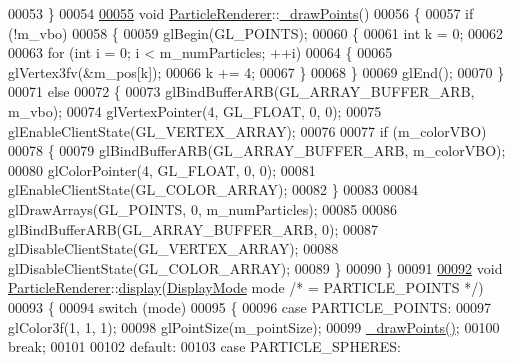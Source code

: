 \begin{DoxyCode}
00053 \}
00054 
\hypertarget{render__particles_8cpp_source_l00055}{}\hyperlink{class_particle_renderer_a2683c43c010bff7973a977c1953f2bd6}{00055} \textcolor{keywordtype}{void} \hyperlink{class_particle_renderer}{ParticleRenderer}::\hyperlink{class_particle_renderer_a2683c43c010bff7973a977c1953f2bd6}{\_drawPoints}()
00056 \{
00057     \textcolor{keywordflow}{if} (!m\_vbo)
00058     \{
00059         glBegin(GL\_POINTS);
00060         \{
00061             \textcolor{keywordtype}{int} k = 0;
00062 
00063             \textcolor{keywordflow}{for} (\textcolor{keywordtype}{int} i = 0; i < m\_numParticles; ++i)
00064             \{
00065                 glVertex3fv(&m\_pos[k]);
00066                 k += 4;
00067             \}
00068         \}
00069         glEnd();
00070     \}
00071     \textcolor{keywordflow}{else}
00072     \{
00073         glBindBufferARB(GL\_ARRAY\_BUFFER\_ARB, m\_vbo);
00074         glVertexPointer(4, GL\_FLOAT, 0, 0);
00075         glEnableClientState(GL\_VERTEX\_ARRAY);
00076 
00077         \textcolor{keywordflow}{if} (m\_colorVBO)
00078         \{
00079             glBindBufferARB(GL\_ARRAY\_BUFFER\_ARB, m\_colorVBO);
00080             glColorPointer(4, GL\_FLOAT, 0, 0);
00081             glEnableClientState(GL\_COLOR\_ARRAY);
00082         \}
00083 
00084         glDrawArrays(GL\_POINTS, 0, m\_numParticles);
00085 
00086         glBindBufferARB(GL\_ARRAY\_BUFFER\_ARB, 0);
00087         glDisableClientState(GL\_VERTEX\_ARRAY);
00088         glDisableClientState(GL\_COLOR\_ARRAY);
00089     \}
00090 \}
00091 
\hypertarget{render__particles_8cpp_source_l00092}{}\hyperlink{class_particle_renderer_a80b2f52dc28bb3abbde021f7fe96f8ff}{00092} \textcolor{keywordtype}{void} \hyperlink{class_particle_renderer}{ParticleRenderer}::\hyperlink{class_particle_renderer_a80b2f52dc28bb3abbde021f7fe96f8ff}{display}(\hyperlink{class_particle_renderer_a7b691afffd1abe415cb0ce17fd26f3d5}{DisplayMode} mode \textcolor{comment}{/* =
       PARTICLE\_POINTS */})
00093 \{
00094     \textcolor{keywordflow}{switch} (mode)
00095     \{
00096         \textcolor{keywordflow}{case} PARTICLE\_POINTS:
00097             glColor3f(1, 1, 1);
00098             glPointSize(m\_pointSize);
00099             \hyperlink{class_particle_renderer_a2683c43c010bff7973a977c1953f2bd6}{\_drawPoints}\hyperlink{class_particle_renderer_a2683c43c010bff7973a977c1953f2bd6}{(}\hyperlink{class_particle_renderer_a2683c43c010bff7973a977c1953f2bd6}{)};
00100             \textcolor{keywordflow}{break};
00101 
00102         \textcolor{keywordflow}{default}:
00103         \textcolor{keywordflow}{case} PARTICLE\_SPHERES:

\end{DoxyCode}
